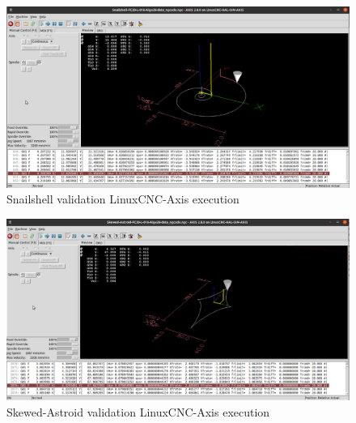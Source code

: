 \clearpage
\pagebreak
\begin{landscape}
	
	\begin{figure}
		\centering
		\caption  {Snailshell validation LinuxCNC-Axis execution}
		\label{img-Snailshell validation LinuxCNC-Axis execution}
		\includegraphics[width=1.65\textwidth]{Chap4/Validation/Snailshell/Snailshell-FC20-L-018-Algo28-CNC-Validation-Screenshot_2023-10-09_10-25-28.png} 
	\end{figure}	
	
\end{landscape}

\clearpage
\pagebreak
\begin{landscape}
	
	\begin{figure}
		\centering
		\caption  {Skewed-Astroid validation LinuxCNC-Axis execution}
		\label{img-Skewed-Astroid validation LinuxCNC-Axis execution}
		\includegraphics[width=1.65\textwidth]{Chap4/Validation/Skewed-Astroid/Skewed-Astroid-FC20-L-018-Algo28-CNC-Validation-Screenshot_2023-10-09_10-38-31.png} 
	\end{figure}	
	
\end{landscape}


